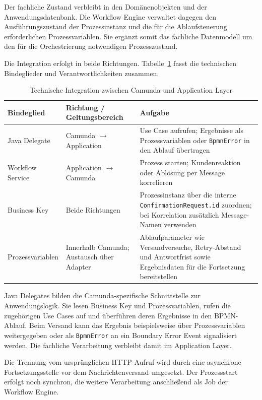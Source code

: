 Der fachliche Zustand verbleibt in den Domänenobjekten und der
Anwendungsdatenbank. Die Workflow Engine verwaltet dagegen den
Ausführungszustand der Prozessinstanz und die für die Ablaufsteuerung
erforderlichen Prozessvariablen. Sie ergänzt somit das fachliche Datenmodell um
den für die Orchestrierung notwendigen Prozesszustand.

Die Integration erfolgt in beide Richtungen.
Tabelle~\ref{tab:workflow-integration} fasst die technischen Bindeglieder und
Verantwortlichkeiten zusammen.

\begin{table}[htbp]
  \centering
  \caption{Technische Integration zwischen Camunda und Application Layer}
  \label{tab:workflow-integration}
  \small
  \setlength{\tabcolsep}{5pt}
  \begin{tabularx}{\textwidth}{@{}>{\raggedright\arraybackslash}p{}>{\raggedright\arraybackslash}p{}>{\raggedright\arraybackslash}X@{}}
    \toprule
    Bindeglied & Richtung / Geltungsbereich & Aufgabe \\
    \midrule
    Java Delegate & Camunda $\rightarrow$ Application
      & Use Case aufrufen; Ergebnisse als Prozessvariablen oder \texttt{BpmnError} in den Ablauf übertragen \\
    Workflow Service & Application $\rightarrow$ Camunda
      & Prozess starten; Kundenreaktion oder Ablösung per Message korrelieren \\
    Business Key & Beide Richtungen
      & Prozessinstanz über die interne \texttt{ConfirmationRequest.id} zuordnen; bei Korrelation zusätzlich Message-Namen verwenden \\
    Prozessvariablen & Innerhalb Camunda; Austausch über Adapter
      & Ablaufparameter wie Versandversuche, Retry-Abstand und Antwortfrist sowie Ergebnisdaten für die Fortsetzung bereitstellen \\
    \bottomrule
  \end{tabularx}
\end{table}

Java Delegates bilden die Camunda-spezifische Schnittstelle zur
Anwendungslogik. Sie lesen Business Key und Prozessvariablen, rufen die
zugehörigen Use Cases auf und überführen deren Ergebnisse in den
BPMN-Ablauf. Beim Versand kann das Ergebnis beispielsweise über
Prozessvariablen weitergegeben oder als \texttt{BpmnError} an ein Boundary
Error Event signalisiert werden. Die fachliche Verarbeitung verbleibt damit im
Application Layer.

Die Trennung vom ursprünglichen HTTP-Aufruf wird durch eine asynchrone
Fortsetzungsstelle vor dem Nachrichtenversand umgesetzt. Der Prozessstart
erfolgt noch synchron, die weitere Verarbeitung anschließend als Job der
Workflow Engine.


